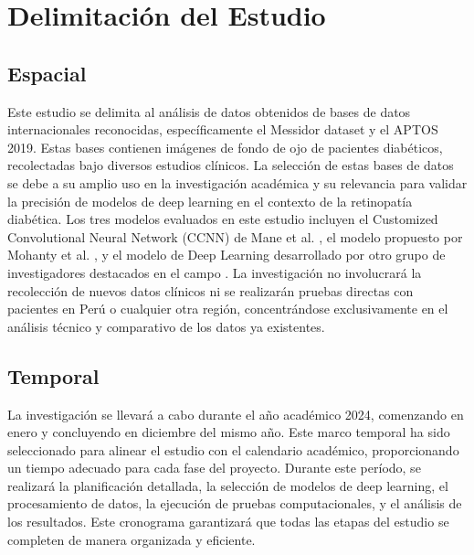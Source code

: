\section{Delimitación del Estudio}

\subsection{Espacial}
Este estudio se delimita al análisis de datos obtenidos de bases de datos internacionales reconocidas, específicamente el Messidor dataset y el APTOS 2019. Estas bases contienen imágenes de fondo de ojo de pacientes diabéticos, recolectadas bajo diversos estudios clínicos. La selección de estas bases de datos se debe a su amplio uso en la investigación académica y su relevancia para validar la precisión de modelos de deep learning en el contexto de la retinopatía diabética. Los tres modelos evaluados en este estudio incluyen el Customized Convolutional Neural Network (CCNN) de Mane et al. \cite{mane2023customized}, el modelo propuesto por Mohanty et al. \cite{mohanty2023using}, y el modelo de Deep Learning desarrollado por otro grupo de investigadores destacados en el campo \cite{huang2023advances}. La investigación no involucrará la recolección de nuevos datos clínicos ni se realizarán pruebas directas con pacientes en Perú o cualquier otra región, concentrándose exclusivamente en el análisis técnico y comparativo de los datos ya existentes.


\subsection{Temporal}
La investigación se llevará a cabo durante el año académico 2024, comenzando en enero y concluyendo en diciembre del mismo año. Este marco temporal ha sido seleccionado para alinear el estudio con el calendario académico, proporcionando un tiempo adecuado para cada fase del proyecto. Durante este período, se realizará la planificación detallada, la selección de modelos de deep learning, el procesamiento de datos, la ejecución de pruebas computacionales, y el análisis de los resultados. Este cronograma garantizará que todas las etapas del estudio se completen de manera organizada y eficiente.




